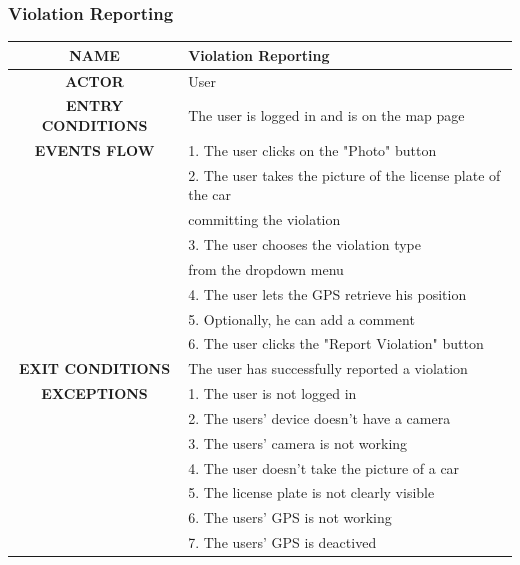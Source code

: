 \documentclass[12pt,a4paper]{article}
\begin{document}
\subsubsection{Violation Reporting}
\begin{center}
			\begin{tabular}{| c | l |}
				\hline
				\textbf{NAME} & Violation Reporting\\
				\hline
				\textbf{ACTOR} & User \\
				\hline
				\textbf{ENTRY CONDITIONS} & The user is logged in and is on the map page\\
				\hline
				\textbf{EVENTS FLOW}  &
				1. The user clicks on the "Photo" button\\
				&2. The user takes the picture of the license plate of the car\\
				& committing the violation\\
				&3. The user chooses the violation type\\
				& from the dropdown menu\\
				&4. The user lets the GPS retrieve his position\\
				&5. Optionally, he can add a comment\\
				&6. The user clicks the "Report Violation" button\\
				\hline
				\textbf{EXIT CONDITIONS}  & The user has successfully reported a violation \\ 
				\hline
				\textbf{EXCEPTIONS} &
				1. The user is not logged in\\
				&2. The users' device doesn't have a camera\\
				&3. The users' camera is not working\\
				&4. The user doesn't take the picture of a car\\
				&5. The license plate is not clearly visible \\
				&6. The users' GPS is not working \\
				&7. The users' GPS is deactived\\
				\hline
			\end{tabular}
		\end{center}
\newpage
\end{document}
